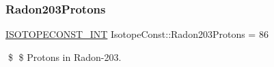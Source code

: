 \subsubsection{\texorpdfstring{Radon203\+Protons}{Radon203Protons}}
{\footnotesize\ttfamily \mbox{\hyperlink{group___isotope_const-_macros_ga5f18360b3e99483a35c32d789e62621c}{I\+S\+O\+T\+O\+P\+E\+C\+O\+N\+S\+T\+\_\+\+I\+NT}} Isotope\+Const\+::\+Radon203\+Protons = 86}

\$ \$ Protons in Radon-\/203. 
